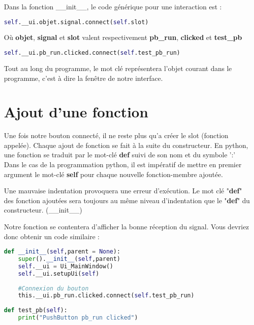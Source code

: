 Dans la fonction \_\_init\_\_, le code générique pour une interaction est  : \newline
\begin{lstlisting}[language=python]
	 self.__ui.objet.signal.connect(self.slot)
\end{lstlisting}
Où \textbf{objet}, \textbf{signal} et \textbf{slot} valent respectivement \textbf{pb\_run}, \textbf{clicked} et \textbf{test\_pb}
\begin{lstlisting}[language=python]
	 self.__ui.pb_run.clicked.connect(self.test_pb_run)
\end{lstlisting}
Tout au long du programme, le mot clé  représentera l'objet courant dans le programme, c'est à dire la fenêtre de notre interface. \newline

\section{Ajout d'une fonction}

Une fois notre bouton connecté, il ne reste plus qu'a créer le slot (fonction appelée). \newline
Chaque ajout de fonction se fait à la suite du constructeur.
En python, une fonction se traduit par le mot-clé \textbf{def} suivi de son nom et du symbole ':' \newline
{\color{red}Dans le cas de la programmation python, il est impératif de mettre en premier argument le mot-clé \textbf{self} pour chaque nouvelle fonction-membre ajoutée.} \newline

Une mauvaise indentation provoquera une erreur d'exécution. 
Le mot clé "\textbf{def}" des fonction ajoutées sera toujours au même niveau d'indentation que le "\textbf{def}" du constructeur. (\_\_init\_\_)\newline

Notre fonction  se contentera d'afficher la bonne réception du signal. Vous devriez donc obtenir un code similaire : \newline

\begin{lstlisting}[language=Python]
def __init__(self,parent = None):
    super().__init__(self,parent)
    self.__ui = Ui_MainWindow()
    self.__ui.setupUi(self)
    
    #Connexion du bouton
    this.__ui.pb_run.clicked.connect(self.test_pb_run)
        
def test_pb(self):
    print("PushButton pb_run clicked")
        
\end{lstlisting}


